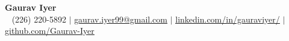 
\begin{center}
    {\Huge \textbf{Gaurav Iyer}} \\ \vspace{3pt}
    \normalsize \raisebox{-0.1\height} ~
    (226) 220-5892 {$\mid$}
    \href{mailto:gaurav.iyer99@gmail.com}{\uline{gaurav.iyer99@gmail.com}} {$\mid$}
    \href{https://www.linkedin.com/in/gauraviyer/}{ \uline{linkedin.com/in/gauraviyer/}} {$\mid$} 
    \href{https://github.com/Gaurav-Iyer}{ \uline{github.com/Gaurav-Iyer}}
\end{center}
